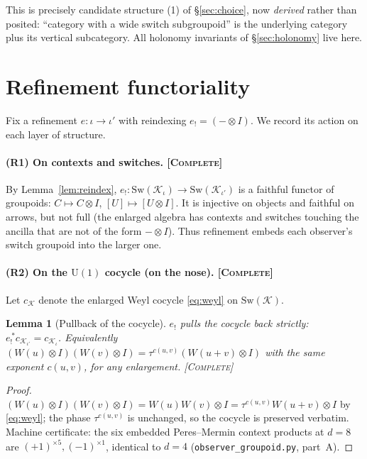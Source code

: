 \documentclass[11pt]{article}
\newtheorem{lemma}{Lemma}
\theoremstyle{definition}
\theoremstyle{remark}
\newcommand{\K}{\mathcal K}
\newcommand{\Sw}{\mathrm{Sw}}
\newcommand{\U}{\mathrm{U}}
\newcommand{\Wop}{W}
\newcommand{\pushf}[1]{{#1}_{!}}
\newcommand{\STC}{{\normalfont\textsc{[Complete]}}}
\begin{document}
\noindent This is precisely candidate structure (1) of \S\ref{sec:choice}, now
\emph{derived} rather than posited: ``category with a wide switch subgroupoid'' is the
underlying category plus its vertical subcategory. All holonomy invariants of
\S\ref{sec:holonomy} live here.

\section{Refinement functoriality}\label{sec:refine}

Fix a refinement $e:\iota\to\iota'$ with reindexing $\pushf e=(-\otimes I)$. We record
its action on each layer of structure.

\paragraph{(R1) On contexts and switches. \STC}
By Lemma~\ref{lem:reindex}, $\pushf e:\Sw(\K_\iota)\to\Sw(\K_{\iota'})$ is a faithful
functor of groupoids: $C\mapsto C\otimes I$, $[U]\mapsto[U\otimes I]$. It is injective
on objects and faithful on arrows, but not full (the enlarged algebra has contexts and
switches touching the ancilla that are not of the form $-\otimes I$). Thus refinement
embeds each observer's switch groupoid into the larger one.

\paragraph{(R2) On the $\U(1)$ cocycle (on the nose). \STC}
Let $c_{\K}$ denote the enlarged Weyl cocycle \eqref{eq:weyl} on $\Sw(\K)$.

\begin{lemma}[Pullback of the cocycle]\label{lem:pull}
$\pushf e$ pulls the cocycle back strictly: $\pushf e^{\,\ast}c_{\K_{\iota'}}=c_{\K_\iota}$.
Equivalently $(\Wop(u)\otimes I)(\Wop(v)\otimes I)=\tau^{c(u,v)}(\Wop(u+v)\otimes I)$
with the \emph{same} exponent $c(u,v)$, for any enlargement. \STC
\end{lemma}
\begin{proof}
$(\Wop(u)\otimes I)(\Wop(v)\otimes I)=\Wop(u)\Wop(v)\otimes
I=\tau^{c(u,v)}\Wop(u+v)\otimes I$ by \eqref{eq:weyl}; the phase $\tau^{c(u,v)}$ is
unchanged, so the cocycle is preserved verbatim. Machine certificate: the six embedded
Peres--Mermin context products at $d=8$ are $(+1)^{\times5},(-1)^{\times1}$, identical
to $d=4$ (\texttt{observer\_groupoid.py}, part~A). \end{proof}
\end{document}
